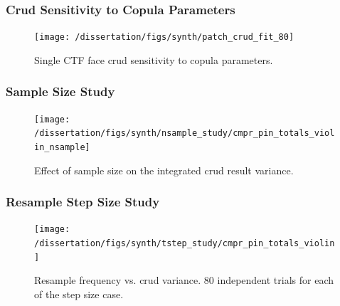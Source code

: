 \documentclass[t, pdftex]{beamer}
\begin{document}
\begin{frame}
\frametitle{Crud Sensitivity to Copula Parameters}
\vspace{-18pt}
\begin{figure}[H]
    \centering
    \texttt{[image: /dissertation/figs/synth/patch\_crud\_fit\_80]}
    \caption{\centering Single CTF face crud sensitivity to copula parameters.}
    \label{fig:patchcrudfit80}
\end{figure}
\end{frame}

\begin{frame}
\frametitle{Sample Size Study}
\vspace{-18pt}
\begin{figure}[H]
    \centering
    \texttt{[image: /dissertation/figs/synth/nsample\_study/cmpr\_pin\_totals\_violin\_nsample]}
    \caption{\centering Effect of sample size on the integrated crud result variance.}
    \label{fig:cmprpintotalsviolinnsample}
\end{figure}
\end{frame}

\begin{frame}
\frametitle{Resample Step Size Study}
\vspace{-18pt}
\begin{figure}[H]
    \centering
    \texttt{[image: /dissertation/figs/synth/tstep\_study/cmpr\_pin\_totals\_violin]}
    \caption{\scriptsize Resample frequency vs. crud variance.  80 independent trials for each of the step size case.}
    \label{fig:cmprpintotalsviolin}
\end{figure}
\end{frame}


\end{document}
